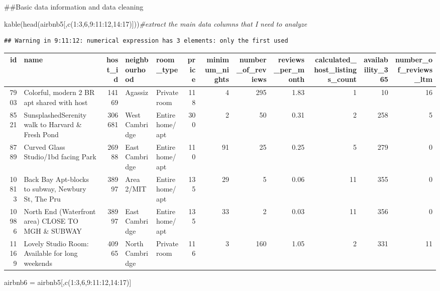 \documentclass[
]{article}
\newenvironment{Shaded}{\begin{snugshade}}{\end{snugshade}}
\newcommand{\CommentTok}[1]{\textcolor[rgb]{0.56,0.35,0.01}{\textit{#1}}}
\newcommand{\DecValTok}[1]{\textcolor[rgb]{0.00,0.00,0.81}{#1}}
\newcommand{\FunctionTok}[1]{\textcolor[rgb]{0.00,0.00,0.00}{#1}}
\newcommand{\NormalTok}[1]{#1}
\newcommand{\OtherTok}[1]{\textcolor[rgb]{0.56,0.35,0.01}{#1}}
\newcommand{\SpecialCharTok}[1]{\textcolor[rgb]{0.00,0.00,0.00}{#1}}
\begin{document}
\#\#Basic data information and data cleaning

\begin{Shaded}
\begin{Highlighting}[]
\FunctionTok{kable}\NormalTok{(}\FunctionTok{head}\NormalTok{(airbnb5[,}\FunctionTok{c}\NormalTok{(}\DecValTok{1}\SpecialCharTok{:}\DecValTok{3}\NormalTok{,}\DecValTok{6}\NormalTok{,}\DecValTok{9}\SpecialCharTok{:}\DecValTok{11}\SpecialCharTok{:}\DecValTok{12}\NormalTok{,}\DecValTok{14}\SpecialCharTok{:}\DecValTok{17}\NormalTok{)]))}\CommentTok{\#extract the main data columns that I need to analyze}
\end{Highlighting}
\end{Shaded}

\begin{verbatim}
## Warning in 9:11:12: numerical expression has 3 elements: only the first used
\end{verbatim}

\begin{tabular}{r|l|r|l|l|r|r|r|r|r|r|r}
\hline
id & name & host\_id & neighbourhood & room\_type & price & minimum\_nights & number\_of\_reviews & reviews\_per\_month & calculated\_host\_listings\_count & availability\_365 & number\_of\_reviews\_ltm\\
\hline
7903 & Colorful, modern 2 BR apt shared with host & 14169 & Agassiz & Private room & 118 & 4 & 295 & 1.83 & 1 & 10 & 16\\
\hline
8521 & SunsplashedSerenity walk to Harvard \& Fresh Pond & 306681 & West Cambridge & Entire home/apt & 300 & 2 & 50 & 0.31 & 2 & 258 & 5\\
\hline
8789 & Curved Glass Studio/1bd facing Park & 26988 & East Cambridge & Entire home/apt & 110 & 91 & 25 & 0.25 & 5 & 279 & 0\\
\hline
10813 & Back Bay Apt-blocks to subway, Newbury St, The Pru & 38997 & Area 2/MIT & Entire home/apt & 135 & 29 & 5 & 0.06 & 11 & 355 & 0\\
\hline
10986 & North End (Waterfront area)  CLOSE TO MGH \& SUBWAY & 38997 & East Cambridge & Entire home/apt & 135 & 33 & 2 & 0.03 & 11 & 356 & 0\\
\hline
11169 & Lovely Studio Room: Available for long weekends & 40965 & North Cambridge & Private room & 116 & 3 & 160 & 1.05 & 2 & 331 & 11\\
\hline
\end{tabular}

\begin{Shaded}
\begin{Highlighting}[]
\NormalTok{airbnb6 }\OtherTok{=}\NormalTok{ airbnb5[,}\FunctionTok{c}\NormalTok{(}\DecValTok{1}\SpecialCharTok{:}\DecValTok{3}\NormalTok{,}\DecValTok{6}\NormalTok{,}\DecValTok{9}\SpecialCharTok{:}\DecValTok{11}\SpecialCharTok{:}\DecValTok{12}\NormalTok{,}\DecValTok{14}\SpecialCharTok{:}\DecValTok{17}\NormalTok{)]}
\end{Highlighting}
\end{Shaded}
\end{document}
